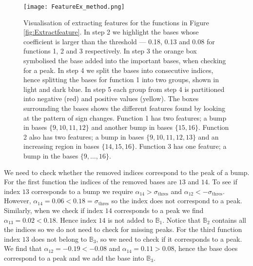 \documentclass[../main.tex]{subfiles}
\begin{document}
     \begin{figure}[t!]
   \hrulefill
   \begin{center} 
    {\texttt{[image: FeatureEx\_method.png]} }
    \end{center}     
    \caption{Visualisation of extracting features for the functions in Figure \ref{fig:Extractfeature}. In step 2 we highlight the bases whose coefficient is larger than the threshold --- 0.18, 0.13 and 0.08 for functions 1, 2 and 3 respectively. In step 3 the orange box symbolised the base added into the important bases, when checking for a peak. In step 4 we split the bases into consecutive indices, hence splitting the bases for function 1 into two groups, shown in light and dark blue. In step 5 each group from step 4 is partitioned into negative (red) and positive values (yellow). The boxes surrounding the bases shows the different features found by looking at the pattern of sign changes. Function 1 has two features; a bump in bases $\{9,10,11,12\}$ and another bump in bases $\{15,16\}$. Function 2 also has two features; a bump in bases $\{9,10,11,12,13\}$ and an increasing region in bases $\{14,15,16\}$. Function 3 has one feature; a bump in the bases $\{9, \dots, 16\}$.}
    \label{fig:tableFeatures}
    \hrulefill
    \end{figure}
  
  We need to check whether the removed indices correspond to the peak of a bump. For the first function the indices of the removed bases are $13$ and $14$. To see if index $13$ corresponds to a bump we require $\alpha_{14} > \sigma_{\mathrm{thres}}$ and $\alpha_{12} < -\sigma_{\mathrm{thres}}$. However, $\alpha_{14} = 0.06 < 0.18 = \sigma_{\mathrm{thres}}$ so the index does not correspond to a peak. Similarly, when we check if index $14$ corresponds to a peak we find  $\alpha_{13} =0.02 < 0.18$. Hence index $14$ is not added to $\mathbb{B}_1$. Notice that $\mathbb{B}_2$ contains all the indices so we do not need to check for missing peaks. For the third function index $13$ does not belong to $\mathbb{B}_3$, so we need to check if it corresponds to a peak. We find that $\alpha_{12} =-0.19 < -0.08$ and $\alpha_{14} =0.11 > 0.08$, hence the base does correspond to a peak and we add the base into $\mathbb{B}_3$.
  
  
\end{document}
